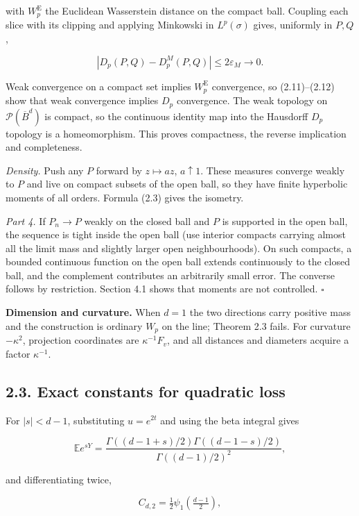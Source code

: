 \documentclass[
  british,
  11pt,
  a4paper,
]{article}
\begin{document}
with \(W_p^{\mathrm E}\) the Euclidean Wasserstein distance on the
compact ball. Coupling each slice with its clipping and applying
Minkowski in \(L^p(\sigma)\) gives, uniformly in \(P,Q\),

\[
|D_p(P,Q)-D_p^M(P,Q)|\leq2\varepsilon_M\longrightarrow0.
\tag{2.12}
\]

Weak convergence on a compact set implies \(W_p^{\mathrm E}\)
convergence, so (2.11)--(2.12) show that weak convergence implies
\(D_p\) convergence. The weak topology on \(\mathcal P(\overline B^d)\)
is compact, so the continuous identity map into the Hausdorff \(D_p\)
topology is a homeomorphism. This proves compactness, the reverse
implication and completeness.

\emph{Density.} Push any \(P\) forward by \(z\mapsto az\),
\(a\uparrow1\). These measures converge weakly to \(P\) and live on
compact subsets of the open ball, so they have finite hyperbolic moments
of all orders. Formula (2.3) gives the isometry.

\emph{Part 4.} If \(P_n\to P\) weakly on the closed ball and \(P\) is
supported in the open ball, the sequence is tight inside the open ball
(use interior compacts carrying almost all the limit mass and slightly
larger open neighbourhoods). On such compacts, a bounded continuous
function on the open ball extends continuously to the closed ball, and
the complement contributes an arbitrarily small error. The converse
follows by restriction. Section 4.1 shows that moments are not
controlled. \(\square\)

\textbf{Dimension and curvature.} When \(d=1\) the two directions carry
positive mass and the construction is ordinary \(W_p\) on the line;
Theorem 2.3 fails. For curvature \(-\kappa^2\), projection coordinates
are \(\kappa^{-1}F_v\), and all distances and diameters acquire a factor
\(\kappa^{-1}\).

\subsection{2.3. Exact constants for quadratic
loss}\label{exact-constants-for-quadratic-loss}

For \(|s|<d-1\), substituting \(u=e^{2t}\) and using the beta integral
gives

\[
\mathbb E e^{sY}
=\frac{\Gamma((d-1+s)/2)\Gamma((d-1-s)/2)}{\Gamma((d-1)/2)^2},
\tag{2.13}
\]

and differentiating twice,

\[
C_{d,2}=\tfrac12\psi_1\!\left(\tfrac{d-1}{2}\right),
\tag{2.14}
\]
\end{document}
